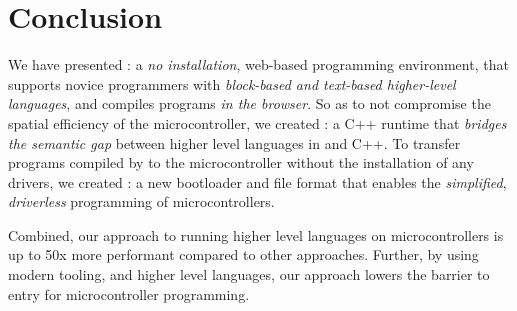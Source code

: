 \section{Conclusion}
\label{sec:conclude}

We have presented \MCN: a \emph{no installation}, web-based programming environment, that supports novice programmers with \emph{block-based and text-based higher-level languages}, and compiles programs \emph{in the browser}. So as to not compromise the spatial efficiency of the microcontroller, we created \CON: a C++ runtime that \emph{bridges the semantic gap} between higher level languages in \MC and C++. To transfer programs compiled by \MC to the microcontroller without the installation of any drivers, we created \UFN: a new bootloader and file format that enables the \emph{simplified}, \emph{driverless} programming of microcontrollers.

Combined, our approach to running higher level languages on microcontrollers is up to 50x more performant compared to other approaches. Further, by using modern tooling, and higher level languages, our approach lowers the barrier to entry for microcontroller programming.



